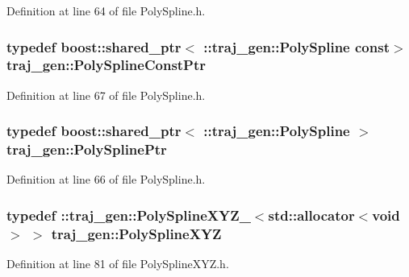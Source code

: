 Definition at line 64 of file Poly\+Spline.\+h.

\subsubsection[{\texorpdfstring{Poly\+Spline\+Const\+Ptr}{PolySplineConstPtr}}]{\setlength{\rightskip}{0pt plus 5cm}typedef boost\+::shared\+\_\+ptr$<$ \+::{\bf traj\+\_\+gen\+::\+Poly\+Spline} const$>$ {\bf traj\+\_\+gen\+::\+Poly\+Spline\+Const\+Ptr}}\hypertarget{namespacetraj__gen_a4600aea34708e71c4c4e9bd52bced08c}{}\label{namespacetraj__gen_a4600aea34708e71c4c4e9bd52bced08c}


Definition at line 67 of file Poly\+Spline.\+h.

\subsubsection[{\texorpdfstring{Poly\+Spline\+Ptr}{PolySplinePtr}}]{\setlength{\rightskip}{0pt plus 5cm}typedef boost\+::shared\+\_\+ptr$<$ \+::{\bf traj\+\_\+gen\+::\+Poly\+Spline} $>$ {\bf traj\+\_\+gen\+::\+Poly\+Spline\+Ptr}}\hypertarget{namespacetraj__gen_a44e912ff4db08ba063c8db02902fd9dc}{}\label{namespacetraj__gen_a44e912ff4db08ba063c8db02902fd9dc}


Definition at line 66 of file Poly\+Spline.\+h.

\subsubsection[{\texorpdfstring{Poly\+Spline\+X\+YZ}{PolySplineXYZ}}]{\setlength{\rightskip}{0pt plus 5cm}typedef \+::{\bf traj\+\_\+gen\+::\+Poly\+Spline\+X\+Y\+Z\+\_\+}$<$std\+::allocator$<$void$>$ $>$ {\bf traj\+\_\+gen\+::\+Poly\+Spline\+X\+YZ}}\hypertarget{namespacetraj__gen_acf62bcf9afe9d715d3663a61cd39b0d6}{}\label{namespacetraj__gen_acf62bcf9afe9d715d3663a61cd39b0d6}


Definition at line 81 of file Poly\+Spline\+X\+Y\+Z.\+h.


